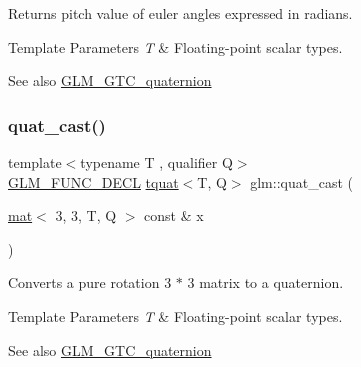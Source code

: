 Returns pitch value of euler angles expressed in radians.


\begin{DoxyTemplParams}{Template Parameters}
{\em T} & Floating-\/point scalar types.\\
\hline
\end{DoxyTemplParams}
\begin{DoxySeeAlso}{See also}
\mbox{\hyperlink{group__gtc__quaternion}{G\+L\+M\+\_\+\+G\+T\+C\+\_\+quaternion}} 
\end{DoxySeeAlso}
\mbox{\label{group__gtc__quaternion_ga03e023aec9acd561a28594bbc8a3abf6}} 
\subsubsection{\texorpdfstring{quat\+\_\+cast()}{quat\_cast()}\hspace{0.1cm}{\footnotesize\ttfamily [1/2]}}
{\footnotesize\ttfamily template$<$typename T , qualifier Q$>$ \\
\mbox{\hyperlink{setup_8hpp_ab2d052de21a70539923e9bcbf6e83a51}{G\+L\+M\+\_\+\+F\+U\+N\+C\+\_\+\+D\+E\+CL}} \mbox{\hyperlink{structglm_1_1tquat}{tquat}}$<$T, Q$>$ glm\+::quat\+\_\+cast (\begin{DoxyParamCaption}\item[{\mbox{\hyperlink{structglm_1_1mat}{mat}}$<$ 3, 3, T, Q $>$ const \&}]{x }\end{DoxyParamCaption})}

Converts a pure rotation 3 $\ast$ 3 matrix to a quaternion.


\begin{DoxyTemplParams}{Template Parameters}
{\em T} & Floating-\/point scalar types.\\
\hline
\end{DoxyTemplParams}
\begin{DoxySeeAlso}{See also}
\mbox{\hyperlink{group__gtc__quaternion}{G\+L\+M\+\_\+\+G\+T\+C\+\_\+quaternion}} 
\end{DoxySeeAlso}
\mbox{\label{group__gtc__quaternion_ga50bb9aecf42fdab04e16039ab6a81c60}} 
